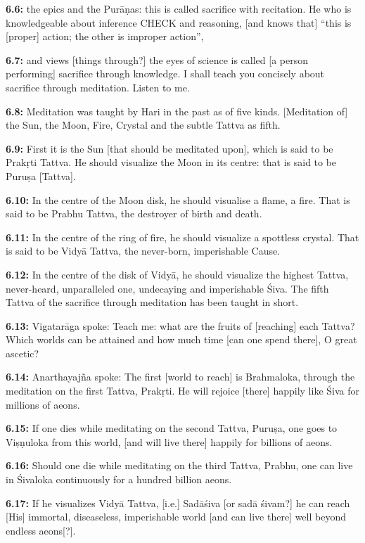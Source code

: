 \documentclass{article}
\newcommand{\vsnum}[1]{\textbf{#1}}
\begin{document}
\vsnum{6.6: }the epics and the Purāṇas: this is called sacrifice with recitation. He who is knowledgeable about inference CHECK and reasoning, [and knows that] ``this is [proper] action; the other is improper action'',

\vsnum{6.7: }and views [things through?] the eyes of science is called [a person performing] sacrifice through knowledge. I shall teach you concisely about sacrifice through meditation. Listen to me.

\vsnum{6.8: }Meditation was taught by Hari in the past as of five kinds. [Meditation of] the Sun, the Moon, Fire, Crystal and the subtle Tattva as fifth.

\vsnum{6.9: }First it is the Sun [that should be meditated upon], which is said to be Prakṛti Tattva. He should visualize the Moon in its centre: that is said to be Puruṣa [Tattva].

\vsnum{6.10: }In the centre of the Moon disk, he should visualise a flame, a fire. That is said to be Prabhu Tattva, the destroyer of birth and death.

\vsnum{6.11: }In the centre of the ring of fire, he should visualize a spottless crystal. That is said to be Vidyā Tattva, the never-born, imperishable Cause.

\vsnum{6.12: }In the centre of the disk of Vidyā, he should visualize the highest Tattva, never-heard, unparalleled one, undecaying and imperishable Śiva. The fifth Tattva of the sacrifice through meditation has been taught in short.

\vsnum{6.13: }Vigatarāga spoke: Teach me: what are the fruits of [reaching] each Tattva? Which worlds can be attained and how much time [can one spend there], O great ascetic?

\vsnum{6.14: }Anarthayajña spoke: The first [world to reach] is Brahmaloka, through the meditation on the first Tattva, Prakṛti. He will rejoice [there] happily like Śiva for millions of aeons.

\vsnum{6.15: }If one dies while meditating on the second Tattva, Puruṣa, one goes to Viṣṇuloka from this world, [and will live there] happily for billions of aeons.

\vsnum{6.16: }Should one die while meditating on the third Tattva, Prabhu, one can live in Śivaloka continuously for a hundred billion aeons.

\vsnum{6.17: }If he visualizes Vidyā Tattva, [i.e.] Sadāśiva [or sadā śivam?] he can reach [His] immortal, diseaseless, imperishable world [and can live there] well beyond endless aeons[?].
\end{document}
